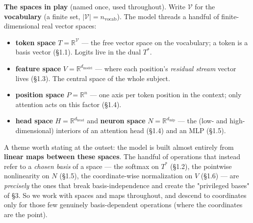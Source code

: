 \begin{callout}
\textbf{The spaces in play} (named once, used throughout). Write $\mathcal V$ for the \textbf{vocabulary} (a finite set, $|\mathcal V| = n_{\text{vocab}}$). The model threads a handful of finite-dimensional real vector spaces:

\begin{itemize}
\item \textbf{token space} $T = \mathbb{R}^{\mathcal V}$ --- the free vector space on the vocabulary; a token is a basis vector (§1.1). Logits live in the dual $T^{*}$.
\item \textbf{feature space} $V = \mathbb{R}^{d_{\text{model}}}$ --- where each position's \emph{residual stream} vector lives (§1.3). The central space of the whole subject.
\item \textbf{position space} $P = \mathbb{R}^{n}$ --- one axis per token position in the context; only attention acts on this factor (§1.4).
\item \textbf{head space} $H = \mathbb{R}^{d_{\text{head}}}$ and \textbf{neuron space} $N = \mathbb{R}^{d_{\text{mlp}}}$ --- the (low- and high-dimensional) interiors of an attention head (§1.4) and an MLP (§1.5).
\end{itemize}

A theme worth stating at the outset: the model is built almost entirely from \textbf{linear maps between these spaces}. The handful of operations that instead refer to a \emph{chosen basis} of a space --- the softmax on $T^{*}$ (§1.2), the pointwise nonlinearity on $N$ (§1.5), the coordinate-wise normalization on $V$ (§1.6) --- are \emph{precisely} the ones that break basis-independence and create the "privileged bases" of §3. So we work with spaces and maps throughout, and descend to coordinates only for those few genuinely basis-dependent operations (where the coordinates are the point).

\end{callout}

